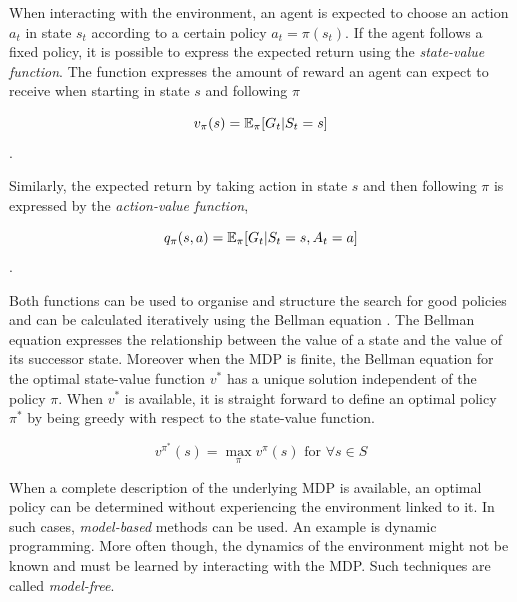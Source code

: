 When interacting with the environment, an agent is expected to choose an action $a_t$ in state $s_t$ according to a certain policy $a_t = \pi(s_t)$. If the agent follows a fixed policy, it is possible to express the expected return using the \textit{state-value function}. The function expresses the amount of reward an agent can expect to receive when starting in state $s$ and following $\pi$

$$v_{\pi}(s) = \operatorname{\mathbb{E}}_{\pi}[G_t|S_t=s]$$.

Similarly, the expected return by taking action in state $s$ and then following $\pi$ is expressed by the \textit{action-value function}, 

$$q_{\pi}(s,a) = \operatorname{\mathbb{E}}_{\pi}[G_t|S_t=s, A_t=a]$$.

Both functions can be used to organise and structure the search for good policies \cite[p.~73]{sutton_reinforcement_1998} and can be calculated iteratively using the Bellman equation \cite{bellman_dynamic_2003}. The Bellman equation expresses the relationship between the value of a state and the value of its successor state. Moreover when the MDP is finite, the Bellman equation for the optimal state-value function $v^*$ has a unique solution independent of the policy $\pi$. When $v^*$ is available, it is straight forward to define an optimal policy $\pi^*$ by being greedy with respect to the state-value function. 

\begin{equation}\label{eq:v_greedy}
v^{\pi^*}(s) = \max_{\pi} v^{\pi}(s) \text{ for } \forall s \in S
\end{equation}


When a complete description of the underlying MDP is available, an optimal policy can be determined without experiencing the environment linked to it. In such cases, \textit{model-based} methods can be used. An example is dynamic programming. More often though, the dynamics of the environment might not be known and must be learned by interacting with the MDP. Such techniques are called \textit{model-free}.

 
 
 
